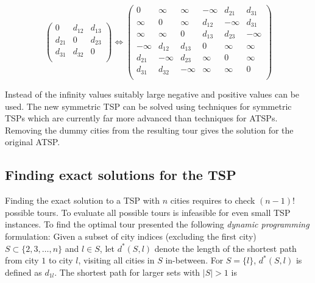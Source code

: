 \documentclass[10pt,a4paper,fleqn]{article}
\begin{document}
\begin{equation*}
\begin{pmatrix}
    0       &d_{12}    &d_{13}    \\
    d_{21} &0          &d_{23}    \\
    d_{31} &d_{32}    &0          \\
\end{pmatrix}
\Longleftrightarrow
\begin{pmatrix}
  0         &\infty     &\infty     & -\infty       &d_{21}    &d_{31}    \\
  \infty    &0          &\infty     & d_{12} &-\infty          &d_{31}    \\
  \infty    &\infty     &0          & d_{13} &d_{23}    &-\infty          \\
  -\infty         &d_{12}    &d_{13}    & 0       &\infty    &\infty      \\
  d_{21}   &-\infty          &d_{23}    & \infty &0         &\infty       \\  
  d_{31}   &d_{32}    &-\infty          & \infty &\infty   &0             \\
\end{pmatrix}
\end{equation*}

Instead of the infinity values suitably large negative and positive values can
be used.  The new symmetric TSP can be solved using techniques for symmetric
TSPs which are currently far more advanced than techniques for ATSPs.
Removing the dummy cities from the resulting tour gives the  solution for the
original ATSP.


\subsection{Finding exact solutions for the TSP}\label{sec:exact}

Finding the exact solution to a TSP with $n$ cities requires to check $(n-1)!$
possible tours. To evaluate all possible tours is infeasible for even small TSP
instances. To find the optimal tour
\cite{Held1962} presented the following
\emph{dynamic programming} formulation: Given a subset of city indices 
(excluding the first city)
$S \subset \{2, 3, \dots, n\}$ and $l \in S$, let $d^*(S, l)$ denote the length of the
shortest path from city $1$ to city $l$, visiting all cities in $S$ in-between.
For $S = \{l\}$, $d^*(S,l)$ is defined as $d_{1l}$. The shortest path for
larger sets with $|S| > 1$ is
\end{document}
